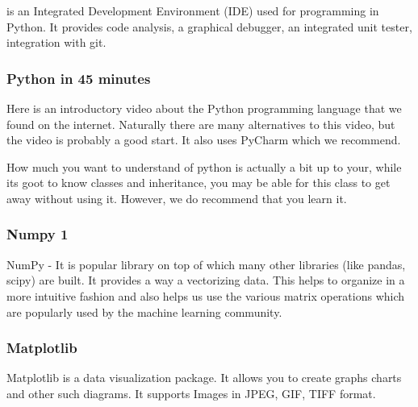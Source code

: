is an Integrated Development Environment (IDE) used for programming in
Python. It provides code analysis, a graphical debugger, an integrated
unit tester, integration with git.


\subsubsection{Python in 45 minutes}\label{python-in-45-minutes}

Here is an introductory video about the Python programming language that
we found on the internet. Naturally there are many alternatives to this
video, but the video is probably a good start. It also uses PyCharm
which we recommend.


How much you want to understand of python is actually a bit up to your,
while its goot to know classes and inheritance, you may be able for this
class to get away without using it. However, we do recommend that you
learn it.

\subsubsection{Numpy 1}\label{numpy-1}

NumPy - It is popular library on top of which many other libraries (like
pandas, scipy) are built. It provides a way a vectorizing data. This
helps to organize in a more intuitive fashion and also helps us use the
various matrix operations which are popularly used by the machine
learning community.




\subsubsection{Matplotlib}\label{matplotlib}

Matplotlib is a data visualization package. It allows you to create
graphs charts and other such diagrams. It supports Images in JPEG, GIF,
TIFF format.


